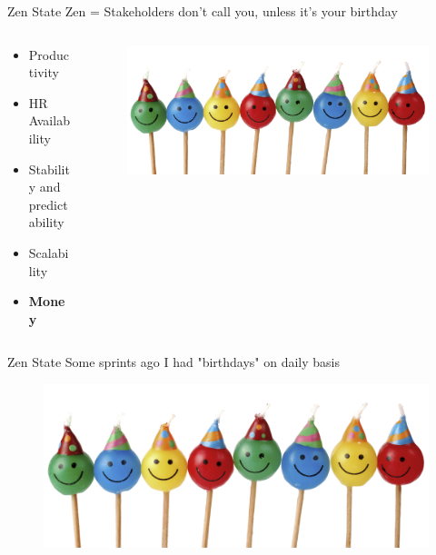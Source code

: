 \documentclass{beamer}
\begin{document}


\begin{frame}{Zen State}
Zen = Stakeholders don't call you, unless it's your birthday


\begin{columns}[T] %
	\begin{column}[T]{5cm} %
\begin{itemize}
	\item Productivity
	\item HR Availability
	\item Stability and predictability
	\item Scalability
	\item \textbf{Money}
\end{itemize}
	\end{column}
	\begin{column}[T]{5cm} %
		\begin{figure}
			\centering
			\includegraphics[width=\linewidth]{Images/candle-heads}
		\end{figure}
	\end{column}
\end{columns}
\end{frame}

\begin{frame}{Zen State}
Some sprints ago I had "birthdays" on daily basis

		\begin{figure}
			\centering
			\includegraphics[width=\linewidth]{Images/candle-heads}
		\end{figure}

\end{frame}
\end{document}
